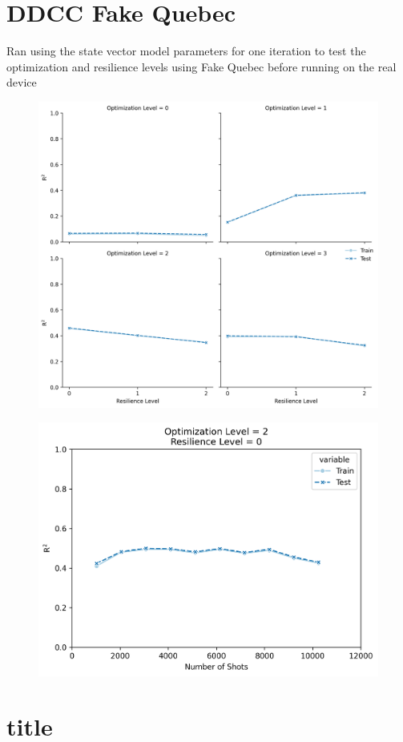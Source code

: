 \documentclass[journal=jacsat,manuscript=article]{achemso}
\begin{document}
\section{DDCC Fake Quebec}\label{section:DDCC_fake}
Ran using the state vector model parameters for one iteration to test the optimization and resilience levels using Fake Quebec before running on the real device

\begin{figure}[H]
	\centering
	\includegraphics[width=1\linewidth]{../images/DDCC/opt_res_fakequebec}
	\caption{}
	\label{fig:optresfakequebec}
\end{figure}

\begin{figure}[H]
	\centering
	\includegraphics[width=1\linewidth]{../images/DDCC/shots_fakequebec}
	\caption{}
	\label{fig:shotsfakequebec}
\end{figure}



\section{title}\label{section:section3}
\end{document}
